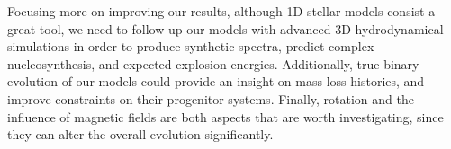 \documentclass[../../main/thesis_msc.tex]{subfiles}
\begin{document}
		
		Focusing more on improving our results, although 1D stellar models consist a great tool, we need to follow-up our models with advanced 3D hydrodynamical simulations in order to produce synthetic spectra, predict complex nucleosynthesis, and expected explosion energies.
		Additionally, true binary evolution of our models could provide an insight on mass-loss histories, and improve constraints on their progenitor systems. Finally, rotation and the influence of magnetic fields are both aspects that are worth investigating, since they can alter the overall evolution significantly.
		
\end{document}
